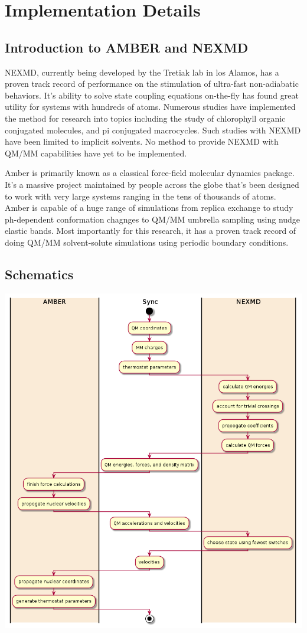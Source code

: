\chapter{Implementation Details} \label{implementationDetails}

\section{Introduction to AMBER and NEXMD}

NEXMD, currently being developed by the Tretiak lab in los Alamos, has a proven track record of performance on the stimulation of ultra-fast non-adiabatic behaviors.
It’s ability to solve state coupling equations on-the-fly has found great utility for systems with hundreds of atoms.
Numerous studies have implemented the method for research into topics including the study of chlorophyll organic conjugated molecules, and pi conjugated macrocycles. \cite{zheng2017photoinduced,nelson2014nonadiabatic,alfonso2016interference,wu2006exciton,Ondarse-Alvarez2016} 
Such studies with NEXMD have been limited to implicit solvents.
No method to provide NEXMD with QM/MM capabilities have yet to be implemented.

Amber is primarily known as a classical force-field molecular dynamics package.
It’s a massive project maintained by people across the globe that's been designed to work with very large systems ranging in the tens of thousands of atoms. \cite{case2020a}
Amber is capable of a huge range of simulations from replica exchange to study ph-dependent conformation chagnges to QM/MM umbrella sampling using nudge elastic bands. \cite{cruzeiro2020exploring, ghoreishi2019fast,sarkar2019ph}
Most importantly for this research, it has a proven track record of doing QM/MM solvent-solute simulations using periodic boundary conditions.

\section{Schematics}
\noindent
\begin{minipage}[c]{\textwidth}
  \centering
  \includegraphics[width=0.5\linewidth]{../Paper2/scripted_diagrams/nasqm_overview.png}
  \label{scheme:nasqm}
\end{minipage}\bigskip

